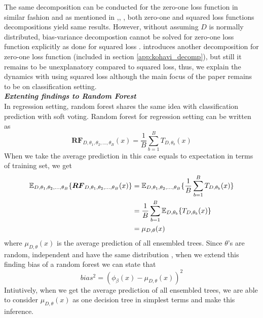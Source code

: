 The same decomposition can be conducted for the zero-one loss function in similar fashion and as mentioned in 
\cite{louppe2014understanding},\cite{domingos2000decomposition}, 
\cite{james2003variance}, \cite{friedman1997zeroLoss}
both zero-one and squared loss functions decompositions yield same results. 
However, without assuming $D$ is normally distributed, bias-variance decompostion 
cannot be solved for zero-one loss function explicitly as done for squared loss \cite{louppe2014understanding}. 
\cite{kohavi1996bias} introduces another decomposition for zero-one loss function (included in section \ref{app:kohavi_decomp}), 
but still it remains to be unexplanatory compared to squared loss, thus, 
we explain the dynamics with using squared loss although the main focus of the paper remains to be on classification setting.
\vspace{2mm}
\\
\textbf{\emph{Extenting findings to Random Forest }}\\
In regression setting, random forest shares the same idea with classification prediction with soft voting. 
Random forest for regression setting can be written as
\begin{equation}
\boldsymbol{RF}_{D, \theta_{1},\theta_{2},..., \theta_{B}}(x) = \dfrac{1}{B}\sum_{b = 1}^{B}T_{D,\theta_{b}}(x)
\end{equation}
When we take the average prediction in this case equals to expectation in terms of training set, we get
\begin{align}\label{eq:mu}
\mathbb{E}_{D, \theta_{1}, \theta_{2},..., \theta_{B}}\{\boldsymbol{RF}_{D, \theta_{1},\theta_{2},..., \theta_{B}}(x) \} 
	& = \mathbb{E}_{D, \theta_{1}, \theta_{2},..., \theta_{B}}\{\dfrac{1}{B}\sum_{b = 1}^{B}T_{D,\theta_{b}}(x)\} \notag \\
	& = \dfrac{1}{B}\sum_{b=1}^{B}\mathbb{E}_{D,\theta_{b}}\{T_{D, \theta_{b}}(x)\}\notag \\
	& = \mu_{D,\theta}(x)
\end{align}
where $\mu_{D,\theta}(x)$ is the average prediction of all ensembled trees. Since $\theta$'s are random, 
independent and have the same distribution \cite{louppe2014understanding}, when we extend this finding bias of a random forest 
we can state that 
\begin{equation}\label{eq:random_forest_bias}
bias^2 = (\phi_{\beta}(x) - \mu_{D,\theta}(x))^2
\end{equation}
Intiutively, when we get the average prediction of all ensembled trees, 
we are able to consider $\mu_{D,\theta}(x)$ as one decision tree in simplest terms and make this inference.
